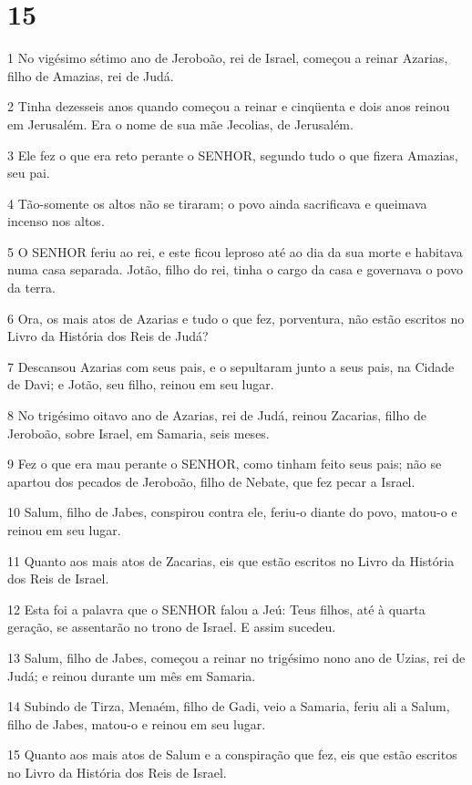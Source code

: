 \chapter{15}

\par 1 No vigésimo sétimo ano de Jeroboão, rei de Israel, começou a reinar Azarias, filho de Amazias, rei de Judá.
\par 2 Tinha dezesseis anos quando começou a reinar e cinqüenta e dois anos reinou em Jerusalém. Era o nome de sua mãe Jecolias, de Jerusalém.
\par 3 Ele fez o que era reto perante o SENHOR, segundo tudo o que fizera Amazias, seu pai.
\par 4 Tão-somente os altos não se tiraram; o povo ainda sacrificava e queimava incenso nos altos.
\par 5 O SENHOR feriu ao rei, e este ficou leproso até ao dia da sua morte e habitava numa casa separada. Jotão, filho do rei, tinha o cargo da casa e governava o povo da terra.
\par 6 Ora, os mais atos de Azarias e tudo o que fez, porventura, não estão escritos no Livro da História dos Reis de Judá?
\par 7 Descansou Azarias com seus pais, e o sepultaram junto a seus pais, na Cidade de Davi; e Jotão, seu filho, reinou em seu lugar.
\par 8 No trigésimo oitavo ano de Azarias, rei de Judá, reinou Zacarias, filho de Jeroboão, sobre Israel, em Samaria, seis meses.
\par 9 Fez o que era mau perante o SENHOR, como tinham feito seus pais; não se apartou dos pecados de Jeroboão, filho de Nebate, que fez pecar a Israel.
\par 10 Salum, filho de Jabes, conspirou contra ele, feriu-o diante do povo, matou-o e reinou em seu lugar.
\par 11 Quanto aos mais atos de Zacarias, eis que estão escritos no Livro da História dos Reis de Israel.
\par 12 Esta foi a palavra que o SENHOR falou a Jeú: Teus filhos, até à quarta geração, se assentarão no trono de Israel. E assim sucedeu.
\par 13 Salum, filho de Jabes, começou a reinar no trigésimo nono ano de Uzias, rei de Judá; e reinou durante um mês em Samaria.
\par 14 Subindo de Tirza, Menaém, filho de Gadi, veio a Samaria, feriu ali a Salum, filho de Jabes, matou-o e reinou em seu lugar.
\par 15 Quanto aos mais atos de Salum e a conspiração que fez, eis que estão escritos no Livro da História dos Reis de Israel.

